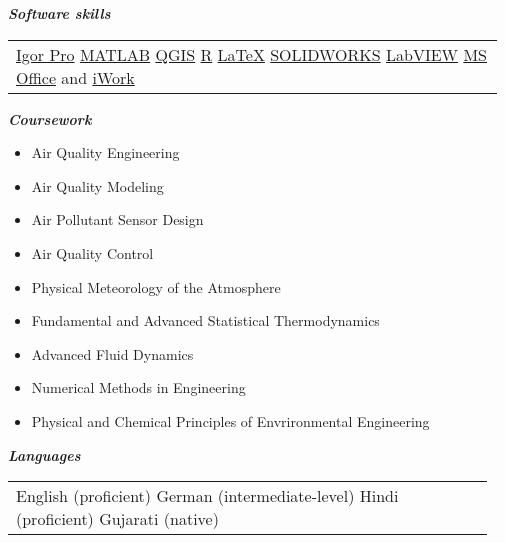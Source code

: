 \documentclass{article}
\begin{document}
\hrulefill
\textit{\textbf{  Software skills  }}
\hrulefill
\vspace{-3mm}
\begin{center}
\begin{tabular}{p{0.97\linewidth}}
\\[-2ex]
\href{https://www.wavemetrics.com/products/igorpro}{Igor Pro}
\hfill
\href{http://www.mathworks.com/products/matlab/}{MATLAB}
\hfill
\href{https://www.qgis.org/en/site/about/index.html}{QGIS}
\hfill
\href{https://www.r-project.org/}{R}
\hfill
\href{http://www.latex-project.org/}{\LaTeX}
\hfill
\href{http://www.solidworks.com/}{SOLIDWORKS}
\hfill
\href{http://www.ni.com/labview/}{LabVIEW}
\hfill
\href{https://products.office.com/en-us/home}{MS Office} and \href{https://www.apple.com/iwork/}{iWork}
\end{tabular}
\end{center}
\vspace{1mm}

\hrulefill
\textit{\textbf{  Coursework  }}
\hrulefill
\vspace{-2.5mm}
\begin{multicols}{3}
\begin{itemize}
\item Air Quality Engineering
\item Air Quality Modeling
\item Air Pollutant Sensor Design
\item Air Quality Control
\item Physical Meteorology of the \newline \vspace{-1ex} Atmosphere
\item Fundamental and Advanced Statistical Thermodynamics
\item Advanced Fluid Dynamics
\item Numerical Methods in \newline \vspace{-1ex}Engineering
\item Physical and Chemical \newline \vspace{-1ex}Principles of Envrironmental Engineering
\end{itemize}
\end{multicols}

\hrulefill
\textit{\textbf{  Languages  }}
\hrulefill
\vspace{-2mm}
\begin{center}
\begin{tabular}{p{0.95\linewidth}}
English (proficient)
\hfill
German (intermediate-level)
\hfill
Hindi (proficient)
\hfill
Gujarati (native)
\end{tabular}
\end{center}
\vspace{1mm}
\end{document}
